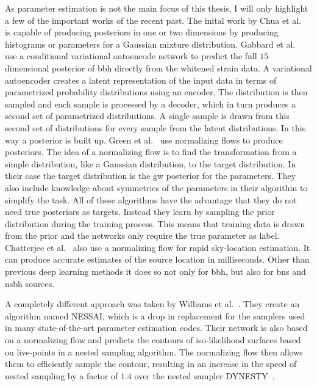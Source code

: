 As parameter estimation is not the main focus of this thesis, I will only highlight a few of the important works of the recent past. The inital work by Chua et al.~\cite{Chua:2019wwt} is capable of producing posteriors in one or two dimensions by producing histograms or parameters for a Gaussian mixture distribution. Gabbard et al.~\cite{Gabbard:2019rde} use a conditional variational autoencode network to predict the full $15$ dimensional posterior of \acrshort{bbh} directly from the whitened strain data. A variational autoencoder creates a latent representation of the input data in terms of parametrized probability distributions using an encoder. The distribution is then sampled and each sample is processed by a decoder, which in turn produces a second set of parametrized distributions. A single sample is drawn from this second set of distributions for every sample from the latent distributions. In this way a posterior is built up. Green et al.~\cite{Green:2020hst, Green:2020dnx, Dax:2021tsq} use normalizing flows to produce posteriors. The idea of a normalizing flow is to find the transformation from a simple distribution, like a Gaussian distribution, to the target distribution. In their case the target distribution is the \acrshort{gw} posterior for the parameters. They also include knowledge about symmetries of the parameters in their algorithm to simplify the task. All of these algorithms have the advantage that they do not need true posteriors as targets. Instead they learn by sampling the prior distribution during the training process. This means that training data is drawn from the prior and the networks only require the true parameter as label. Chatterjee et al.~\cite{Chatterjee:2022ggk} also use a normalizing flow for rapid sky-location estimation. It can produce accurate estimates of the source location in milliseconds. Other than previous deep learning methods it does so not only for \acrshort{bbh}, but also for \acrshort{bns} and \acrshort{nsbh} sources.

A completely different approach was taken by Williams et al.~\cite{Williams:2021qyt}. They create an algorithm named NESSAI, which is a drop in replacement for the samplers used in many state-of-the-art parameter estimation codes. Their network is also based on a normalizing flow and predicts the contours of iso-likelihood surfaces based on live-points in a nested sampling algorithm. The normalizing flow then allows them to efficiently sample the contour, resulting in an increase in the speed of nested sampling by a factor of $1.4$ over the nested sampler DYNESTY~\cite{Speagle:2020aaa}.
